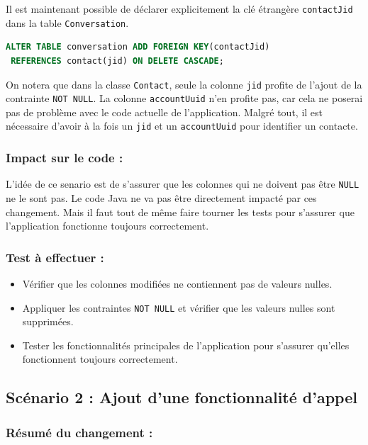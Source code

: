 \documentclass[a4paper,11pt]{article}
\begin{document}
Il est maintenant possible de déclarer explicitement la clé étrangère \texttt{contactJid} dans la table \texttt{Conversation}.

\begin{lstlisting}[language=SQL]
ALTER TABLE conversation ADD FOREIGN KEY(contactJid) 
 REFERENCES contact(jid) ON DELETE CASCADE;
\end{lstlisting}

On notera que dans la classe \texttt{Contact}, seule la colonne \texttt{jid} profite de l'ajout de la contrainte \texttt{NOT NULL}. La colonne \texttt{accountUuid} n'en profite pas, car cela ne poserai pas de problème avec le code actuelle de l'application. Malgré tout, il est nécessaire d'avoir à la fois un \texttt{jid} et un \texttt{accountUuid} pour identifier un contacte.

\subsubsection*{Impact sur le code :}

L'idée de ce senario est de s'assurer que les colonnes qui ne doivent pas être \texttt{NULL} ne le sont pas. Le code Java ne va pas être directement impacté par ces changement. Mais il faut tout de même faire tourner les tests pour s'assurer que l'application fonctionne toujours correctement.

\subsubsection*{Test à effectuer :}

\begin{itemize}
	\item Vérifier que les colonnes modifiées ne contiennent pas de valeurs nulles.
	\item Appliquer les contraintes \texttt{NOT NULL} et vérifier que les valeurs nulles sont supprimées.
	\item Tester les fonctionnalités principales de l'application pour s'assurer qu'elles fonctionnent toujours correctement.
\end{itemize}

\subsection*{Scénario 2 : Ajout d'une fonctionnalité d'appel}

\subsubsection*{Résumé du changement :}
\end{document}
